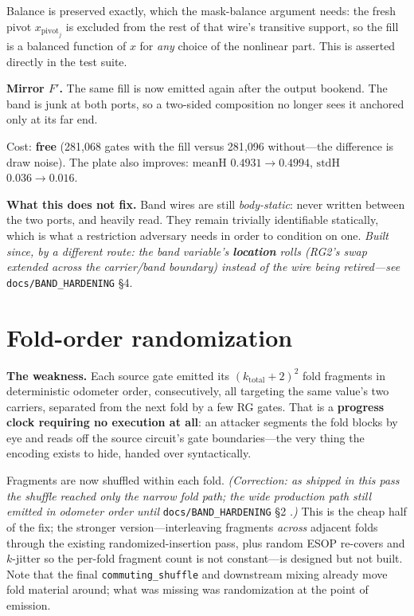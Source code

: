 \documentclass[11pt]{article}
\begin{document}
Balance is preserved exactly, which the mask-balance argument needs: the fresh
pivot $x_{\mathrm{pivot}_j}$ is excluded from the rest of that wire's transitive
support, so the fill is a balanced function of $x$ for \emph{any} choice of the
nonlinear part. This is asserted directly in the test suite.

\textbf{Mirror $F'$.} The same fill is now emitted again after the output
bookend. The band is junk at both ports, so a two-sided composition no longer
sees it anchored only at its far end.

Cost: \textbf{free} (281{,}068 gates with the fill versus 281{,}096 without---the
difference is draw noise). The plate also improves: $\mathrm{meanH}$
$0.4931\to0.4994$, $\mathrm{stdH}$ $0.036\to0.016$.

\textbf{What this does not fix.} Band wires are still \emph{body-static}: never
written between the two ports, and heavily read. They remain trivially
identifiable statically, which is what a restriction adversary needs in order to
condition on one. \emph{Built since, by a different route: the band variable's
\textbf{location} rolls (RG2's swap extended across the carrier/band boundary)
instead of the wire being retired---see} \texttt{docs/BAND\_HARDENING} \S4.

\section{Fold-order randomization}

\textbf{The weakness.} Each source gate emitted its $(k_{\mathrm{total}}+2)^2$
fold fragments in deterministic odometer order, consecutively, all targeting the
same value's two carriers, separated from the next fold by a few RG gates. That
is a \textbf{progress clock requiring no execution at all}: an attacker segments
the fold blocks by eye and reads off the source circuit's gate boundaries---the
very thing the encoding exists to hide, handed over syntactically.

Fragments are now shuffled within each fold. \emph{(Correction: as shipped in
this pass the shuffle reached only the narrow fold path; the wide production
path still emitted in odometer order until} \texttt{docs/BAND\_HARDENING} \S2
\emph{.)} This is the cheap half of the fix;
the stronger version---interleaving fragments \emph{across} adjacent folds
through the existing randomized-insertion pass, plus random ESOP re-covers and
$k$-jitter so the per-fold fragment count is not constant---is designed but not
built. Note that the final \texttt{commuting\_shuffle} and downstream mixing
already move fold material around; what was missing was randomization at the
point of emission.
\end{document}
